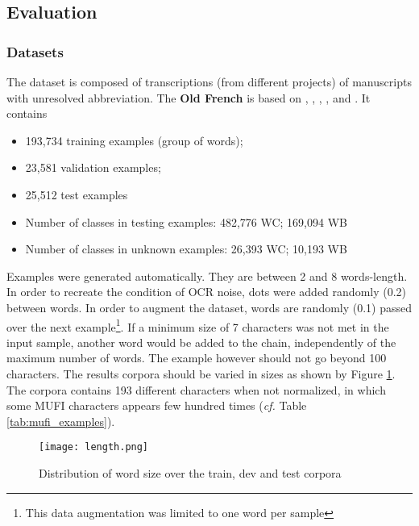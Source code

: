 \documentclass{jdmdh}
\begin{document}
\subsection{Evaluation}

\subsubsection{Datasets}

The dataset is composed of transcriptions (from different projects) of manuscripts with unresolved abbreviation. The \textbf{Old French} is based on \citet{8269990}, \citet{pinche:hal-01628533}, \citet{jean_baptiste_camps_2019_2630574}, \citet{bfmmss}, and \citet{tnah_transcription}. It contains

\begin{itemize}
    \item 193,734 training examples (group of words);
    \item 23,581 validation examples;
    \item 25,512 test examples
    \item Number of classes in testing examples: 482,776 WC; 169,094 WB
    \item Number of classes in unknown examples: 26,393 WC; 10,193 WB
\end{itemize}

Examples were generated automatically. They are between 2 and 8 words-length. In order to recreate the condition of OCR noise, dots were added randomly (0.2) between words. In order to augment the dataset, words are randomly (0.1) passed over the next example\footnote{This data augmentation was limited to one word per sample}. If a minimum size of 7 characters was not met in the input sample, another word would be added to the chain, independently of the maximum number of words. The example however should not go beyond 100 characters. The results corpora should be varied in sizes as shown by Figure \ref{fig:word_sizes}. The corpora contains 193 different characters when not normalized, in which some MUFI characters appears few hundred times (\textit{cf.} Table \ref{tab:mufi_examples}).

\begin{figure}[!ht]
  \centering
  \texttt{[image: length.png]}
  \caption{Distribution of word size over the train, dev and test corpora}
  \label{fig:word_sizes}
\end{figure}
\end{document}
